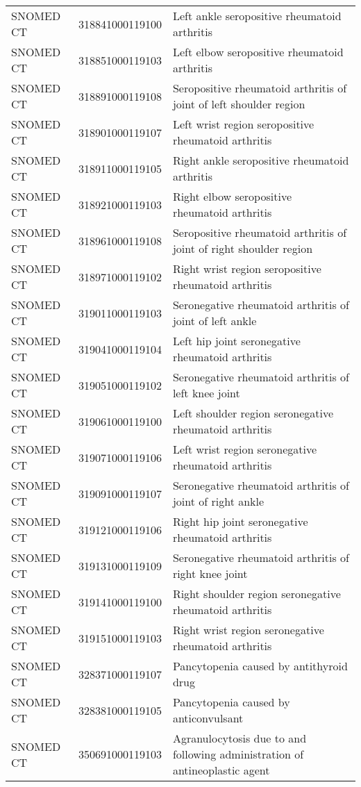 \begin{longtable}{p{}p{}p{}}
  SNOMED CT & 318841000119100 & Left ankle seropositive rheumatoid arthritis \\ 
  SNOMED CT & 318851000119103 & Left elbow seropositive rheumatoid arthritis \\ 
  SNOMED CT & 318891000119108 & Seropositive rheumatoid arthritis of joint of left shoulder region \\ 
  SNOMED CT & 318901000119107 & Left wrist region seropositive rheumatoid arthritis \\ 
  SNOMED CT & 318911000119105 & Right ankle seropositive rheumatoid arthritis \\ 
  SNOMED CT & 318921000119103 & Right elbow seropositive rheumatoid arthritis \\ 
  SNOMED CT & 318961000119108 & Seropositive rheumatoid arthritis of joint of right shoulder region \\ 
  SNOMED CT & 318971000119102 & Right wrist region seropositive rheumatoid arthritis \\ 
  SNOMED CT & 319011000119103 & Seronegative rheumatoid arthritis of joint of left ankle \\ 
  SNOMED CT & 319041000119104 & Left hip joint seronegative rheumatoid arthritis \\ 
  SNOMED CT & 319051000119102 & Seronegative rheumatoid arthritis of left knee joint \\ 
  SNOMED CT & 319061000119100 & Left shoulder region seronegative rheumatoid arthritis \\ 
  SNOMED CT & 319071000119106 & Left wrist region seronegative rheumatoid arthritis \\ 
  SNOMED CT & 319091000119107 & Seronegative rheumatoid arthritis of joint of right ankle \\ 
  SNOMED CT & 319121000119106 & Right hip joint seronegative rheumatoid arthritis \\ 
  SNOMED CT & 319131000119109 & Seronegative rheumatoid arthritis of right knee joint \\ 
  SNOMED CT & 319141000119100 & Right shoulder region seronegative rheumatoid arthritis \\ 
  SNOMED CT & 319151000119103 & Right wrist region seronegative rheumatoid arthritis \\ 
  SNOMED CT & 328371000119107 & Pancytopenia caused by antithyroid drug \\ 
  SNOMED CT & 328381000119105 & Pancytopenia caused by anticonvulsant \\ 
  SNOMED CT & 350691000119103 & Agranulocytosis due to and following administration of antineoplastic agent \\ 

\end{longtable}
